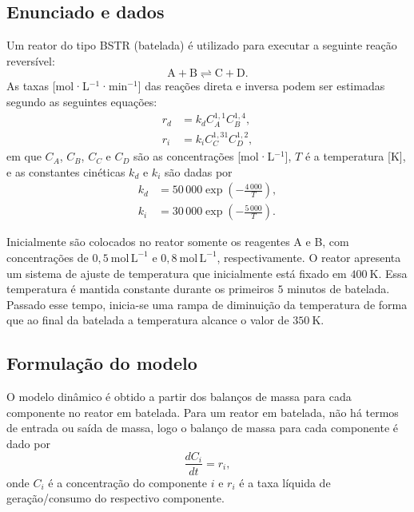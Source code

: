 \documentclass{article}
\begin{document}
\subsection*{Enunciado e dados}
Um reator do tipo BSTR (batelada) é utilizado para executar a seguinte reação reversível:
\begin{equation*}
  \mathrm{A} + \mathrm{B} \rightleftharpoons \mathrm{C} + \mathrm{D}.
\end{equation*}
As taxas [mol·L$^{-1}$·min$^{-1}$] das reações direta e inversa podem ser estimadas segundo as seguintes equações:
\begin{align}
  r_d &= k_d C_A^{1{,}1} C_B^{1{,}4}, \label{eq:rd-q3} \\
  r_i &= k_i C_C^{1{,}31} C_D^{1{,}2}, \label{eq:ri-q3}
\end{align}
em que $C_A$, $C_B$, $C_C$ e $C_D$ são as concentrações [mol·L$^{-1}$], $T$ é a temperatura [K], e as constantes cinéticas $k_d$ e $k_i$ são dadas por
\begin{align}
  k_d &= 50\,000 \exp\left(-\frac{4\,000}{T}\right), \label{eq:kd-q3} \\
  k_i &= 30\,000 \exp\left(-\frac{5\,000}{T}\right). \label{eq:ki-q3}
\end{align}

Inicialmente são colocados no reator somente os reagentes A e B, com concentrações de $0{,}5\ \mathrm{mol\,L^{-1}}$ e $0{,}8\ \mathrm{mol\,L^{-1}}$, respectivamente. O reator apresenta um sistema de ajuste de temperatura que inicialmente está fixado em $400\ \mathrm{K}$. Essa temperatura é mantida constante durante os primeiros $5$ minutos de batelada. Passado esse tempo, inicia-se uma rampa de diminuição da temperatura de forma que ao final da batelada a temperatura alcance o valor de $350\ \mathrm{K}$.

\subsection*{Formulação do modelo}

O modelo dinâmico é obtido a partir dos balanços de massa para cada componente no reator em batelada. Para um reator em batelada, não há termos de entrada ou saída de massa, logo o balanço de massa para cada componente é dado por
\begin{equation*}
  \frac{dC_i}{dt} = r_i,
\end{equation*}
onde $C_i$ é a concentração do componente $i$ e $r_i$ é a taxa líquida de geração/consumo do respectivo componente.
\end{document}
